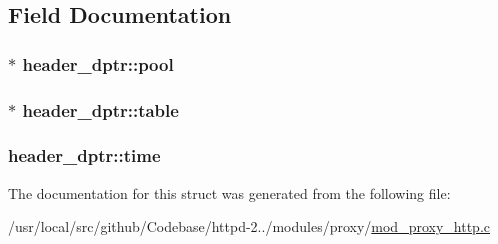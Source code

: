 \subsection{Field Documentation}
\subsubsection[{\texorpdfstring{pool}{pool}}]{$\ast$ header\+\_\+dptr\+::pool}\hypertarget{structheader__dptr_a1c0a41c0559197a82498d4b482475ee1}{}\label{structheader__dptr_a1c0a41c0559197a82498d4b482475ee1}
\subsubsection[{\texorpdfstring{table}{table}}]{$\ast$ header\+\_\+dptr\+::table}\hypertarget{structheader__dptr_ad4ae52ed1ea13a606656d05bed09c044}{}\label{structheader__dptr_ad4ae52ed1ea13a606656d05bed09c044}
\subsubsection[{\texorpdfstring{time}{time}}]{ header\+\_\+dptr\+::time}\hypertarget{structheader__dptr_a4a15fcc5500e1358374583274b5c17b4}{}\label{structheader__dptr_a4a15fcc5500e1358374583274b5c17b4}


The documentation for this struct was generated from the following file\+:\begin{DoxyCompactItemize}
\item 
/usr/local/src/github/\+Codebase/httpd-\/2../modules/proxy/\hyperlink{mod__proxy__http_8c}{mod\+\_\+proxy\+\_\+http.\+c}\end{DoxyCompactItemize}

